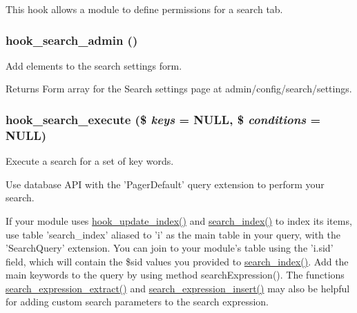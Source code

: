 This hook allows a module to define permissions for a search tab. \hypertarget{group__search_gae7c7a4e3d4ee63b5aab3742b0e12624e}{
\subsubsection[{hook\_\-search\_\-admin}]{\setlength{\rightskip}{0pt plus 5cm}hook\_\-search\_\-admin ()}}
\label{group__search_gae7c7a4e3d4ee63b5aab3742b0e12624e}
Add elements to the search settings form.

\begin{DoxyReturn}{Returns}
Form array for the Search settings page at admin/config/search/settings. 
\end{DoxyReturn}
\hypertarget{group__search_ga00be3e4a3b64ad73f8ad1304a450cee5}{
\subsubsection[{hook\_\-search\_\-execute}]{\setlength{\rightskip}{0pt plus 5cm}hook\_\-search\_\-execute (\$ {\em keys} = {\ttfamily NULL}, \/  \$ {\em conditions} = {\ttfamily NULL})}}
\label{group__search_ga00be3e4a3b64ad73f8ad1304a450cee5}
Execute a search for a set of key words.

Use database API with the 'PagerDefault' query extension to perform your search.

If your module uses \hyperlink{group__search_ga23d6f6642bd53c4f033f10e9c1b12d43}{hook\_\-update\_\-index()} and \hyperlink{group__search_ga57ab9f6e1c404a8c248293e554373ae6}{search\_\-index()} to index its items, use table 'search\_\-index' aliased to 'i' as the main table in your query, with the 'SearchQuery' extension. You can join to your module's table using the 'i.sid' field, which will contain the \$sid values you provided to \hyperlink{group__search_ga57ab9f6e1c404a8c248293e554373ae6}{search\_\-index()}. Add the main keywords to the query by using method searchExpression(). The functions \hyperlink{search_8module_a6d0e1560509bebe41ba4c6a2959ce59c}{search\_\-expression\_\-extract()} and \hyperlink{search_8module_a90b4fc5f716558dc1bf741c239fe1a0e}{search\_\-expression\_\-insert()} may also be helpful for adding custom search parameters to the search expression.

